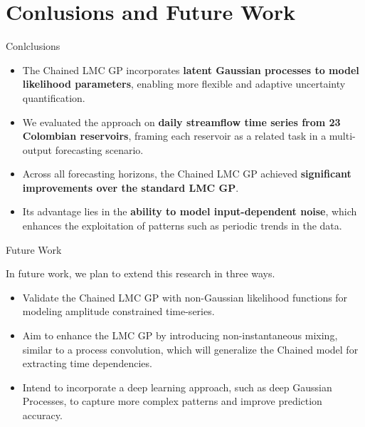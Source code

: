 \section{Conlusions and Future Work}

\begin{frame}{Conlclusions}
	
	\begin{block}{}
	\begin{itemize}
		\item The Chained LMC GP incorporates \textcolor{BrandTeal}{\textbf{latent Gaussian processes to model likelihood parameters}}, enabling more flexible and adaptive uncertainty quantification. 
		\item We evaluated the approach on \textcolor{BrandTeal}{\textbf{daily streamflow time series from 23 Colombian reservoirs}}, framing each reservoir as a related task in a multi-output forecasting scenario.  
		\item Across all forecasting horizons, the Chained LMC GP achieved \textcolor{BrandTeal}{\textbf{significant improvements over the standard LMC GP}}. 
		\item Its advantage lies in the \textcolor{BrandTeal}{\textbf{ability to model input-dependent noise}}, which enhances the exploitation of patterns such as periodic trends in the data. 
	\end{itemize}
	\end{block}
\end{frame}

\begin{frame}{Future Work}
	\begin{block}{}
		In future work, we plan to extend this research in three ways.
		
		\begin{itemize}
			 \item Validate the Chained LMC GP with non-Gaussian likelihood functions for modeling amplitude constrained time-series. 
			 \item Aim to enhance the LMC GP by introducing non-instantaneous mixing, similar to a process convolution, which will generalize the Chained model for extracting time dependencies.
			 \item Intend to incorporate a deep learning approach, such as deep Gaussian Processes, to capture more complex patterns and improve prediction accuracy.
		\end{itemize} 
	\end{block}
\end{frame}

